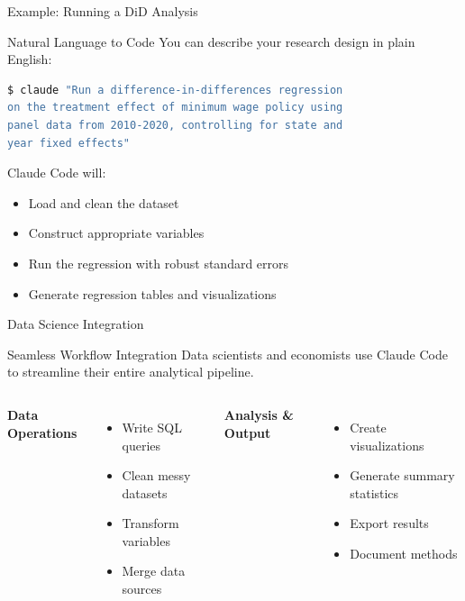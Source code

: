 \documentclass[10pt]{beamer}
\begin{document}
	\begin{frame}[fragile]{Example: Running a DiD Analysis}
		\begin{exampleblock}{Natural Language to Code}
			You can describe your research design in plain English:
		\end{exampleblock}
		
\begin{lstlisting}[language=bash]
$ claude "Run a difference-in-differences regression 
on the treatment effect of minimum wage policy using 
panel data from 2010-2020, controlling for state and 
year fixed effects"
\end{lstlisting}
		
		
		Claude Code will:
		\begin{itemize}
			\item Load and clean the dataset
			\item Construct appropriate variables
			\item Run the regression with robust standard errors
			\item Generate regression tables and visualizations
		\end{itemize}
	\end{frame}
	
	\begin{frame}{Data Science Integration}
		\begin{exampleblock}{Seamless Workflow Integration}
			Data scientists and economists use Claude Code to streamline their entire analytical pipeline.
		\end{exampleblock}
		
		\vspace{0.5cm}
		
		\begin{columns}[T,onlytextwidth]
			\textbf{Data Operations}
			\begin{itemize}
				\item Write SQL queries
				\item Clean messy datasets
				\item Transform variables
				\item Merge data sources
			\end{itemize}
			
			\textbf{Analysis \& Output}
			\begin{itemize}
				\item Create visualizations
				\item Generate summary statistics
				\item Export results
				\item Document methods
			\end{itemize}
		\end{columns}
	\end{frame}
	
\end{document}
